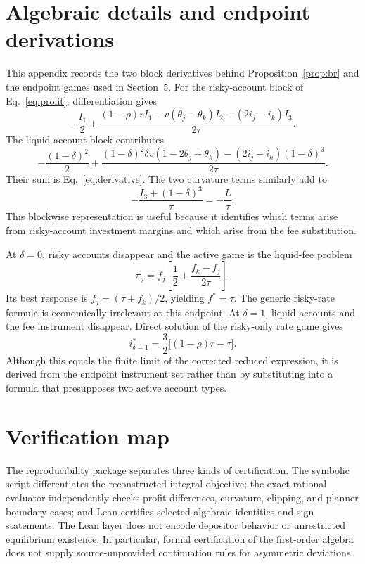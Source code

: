 \appendix
\section{Algebraic details and endpoint derivations}\label{app:algebra}
This appendix records the two block derivatives behind Proposition~\ref{prop:br} and the endpoint games used in Section~5. For the risky-account block of Eq.~\eqref{eq:profit}, differentiation gives
\begin{equation}
-\frac{I_1}{2}+\frac{(1-\rho)rI_1-v(\theta_j-\theta_k)I_2-(2i_j-i_k)I_3}{2\tau}.
\end{equation}
The liquid-account block contributes
\begin{equation}
-\frac{(1-\delta)^2}{2}+\frac{(1-\delta)^2\delta v(1-2\theta_j+\theta_k)
 -(2i_j-i_k)(1-\delta)^3}{2\tau}.
\end{equation}
Their sum is Eq.~\eqref{eq:derivative}. The two curvature terms similarly add to
\[
-\frac{I_3+(1-\delta)^3}{\tau}=-\frac{L}{\tau}.
\]
This blockwise representation is useful because it identifies which terms arise from risky-account investment margins and which arise from the fee substitution.

At $\delta=0$, risky accounts disappear and the active game is the liquid-fee problem
\[
\pi_j=f_j\left[\frac12+\frac{f_k-f_j}{2\tau}\right].
\]
Its best response is $f_j=(\tau+f_k)/2$, yielding $f^*=\tau$. The generic risky-rate formula is economically irrelevant at this endpoint. At $\delta=1$, liquid accounts and the fee instrument disappear. Direct solution of the risky-only rate game gives
\[
 i^*_{\delta=1}=\frac32\big[(1-\rho)r-\tau\big].
\]
Although this equals the finite limit of the corrected reduced expression, it is derived from the endpoint instrument set rather than by substituting into a formula that presupposes two active account types.

\section{Verification map}\label{app:verification}
The reproducibility package separates three kinds of certification. The symbolic script differentiates the reconstructed integral objective; the exact-rational evaluator independently checks profit differences, curvature, clipping, and planner boundary cases; and Lean certifies selected algebraic identities and sign statements. The Lean layer does not encode depositor behavior or unrestricted equilibrium existence. In particular, formal certification of the first-order algebra does not supply source-unprovided continuation rules for asymmetric deviations.

